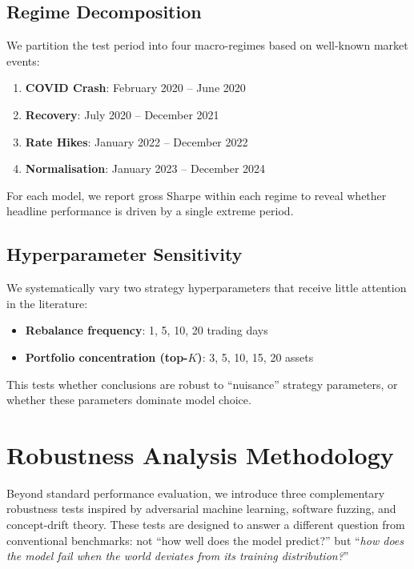 \documentclass[preprint,review,12pt]{elsarticle}
\begin{document}
\subsection{Regime Decomposition}

We partition the test period into four macro-regimes based on well-known market events:
\begin{enumerate}[leftmargin=1.6em]
  \item \textbf{COVID Crash}: February 2020 -- June 2020
  \item \textbf{Recovery}: July 2020 -- December 2021
  \item \textbf{Rate Hikes}: January 2022 -- December 2022
  \item \textbf{Normalisation}: January 2023 -- December 2024
\end{enumerate}

For each model, we report gross Sharpe within each regime to reveal whether headline performance is driven by a single extreme period.

\subsection{Hyperparameter Sensitivity}

We systematically vary two strategy hyperparameters that receive little attention in the literature:
\begin{itemize}[leftmargin=1.4em]
  \item \textbf{Rebalance frequency}: 1, 5, 10, 20 trading days
  \item \textbf{Portfolio concentration (top-$K$)}: 3, 5, 10, 15, 20 assets
\end{itemize}

This tests whether conclusions are robust to ``nuisance'' strategy parameters, or whether these parameters dominate model choice.


\section{Robustness Analysis Methodology}
\label{sec:robustness_method}

Beyond standard performance evaluation, we introduce three complementary robustness tests inspired by adversarial machine learning, software fuzzing, and concept-drift theory.
These tests are designed to answer a different question from conventional benchmarks: not ``how well does the model predict?'' but ``\emph{how does the model fail when the world deviates from its training distribution?}''
\end{document}

